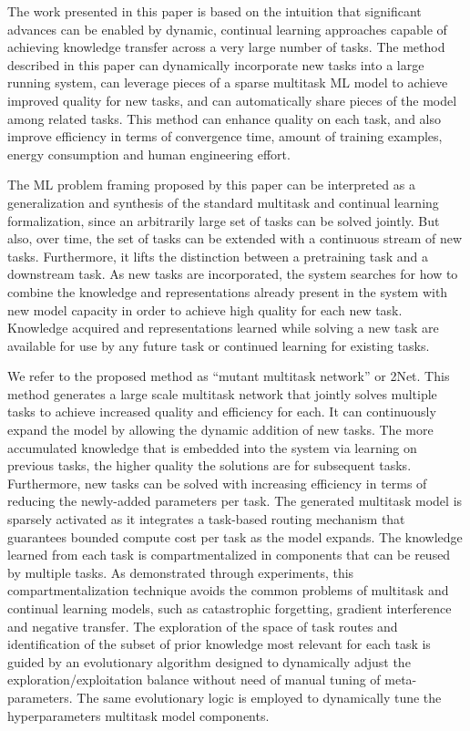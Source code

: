\documentclass{article} \usepackage{iclr2023_conference,times}
\newcommand{\muNet}{2Net\xspace}
\begin{document}
The work presented in this paper is based on the intuition that significant advances can be 
enabled by
dynamic, continual learning 
approaches capable of achieving knowledge transfer across a very large number of tasks.
The method described in this paper can dynamically incorporate new tasks into a large running system,
can leverage pieces of a sparse multitask ML model to achieve improved quality for new tasks,
and can automatically share pieces of the model among related tasks.
This method can enhance quality on each task, and also improve efficiency in terms of convergence time, amount of training examples, energy consumption and human engineering effort. 

The ML problem framing proposed by this paper can be interpreted as a generalization and synthesis of the standard multitask and continual learning formalization,
since an arbitrarily large set of tasks can be solved jointly.
But also, over time, the set of tasks can be extended with a continuous stream of new tasks.
Furthermore, it lifts the distinction between a pretraining task and a downstream task.
As new tasks are incorporated, the system searches for how to combine the knowledge and representations already present in the system with new model capacity in order to achieve high quality for each new task.
Knowledge acquired and representations learned while solving a new task are available for use by any future task or continued learning for existing tasks.

We refer to the proposed method as “mutant multitask network” or \muNet.
This method generates a large scale multitask network that jointly solves multiple tasks to achieve increased quality and efficiency for each.
It can continuously expand the model by allowing the dynamic addition of new tasks.
The more accumulated knowledge that is embedded into the system via learning on previous tasks, the higher quality the solutions are for subsequent tasks.  Furthermore, new tasks can be solved with increasing efficiency in terms of reducing the newly-added parameters per task.
The generated multitask model is sparsely activated as it integrates a task-based routing mechanism that guarantees bounded compute cost per task as the model expands.
The knowledge learned from each task is compartmentalized in components that can be reused by multiple tasks.
As demonstrated through experiments, this compartmentalization technique avoids the common problems of multitask and continual learning models, such as catastrophic forgetting, gradient interference and negative transfer.
The exploration of the space of task routes and identification of the subset of prior knowledge most relevant for each task is guided by an evolutionary algorithm designed to dynamically adjust the exploration/exploitation balance without need of manual tuning of meta-parameters.
The same evolutionary logic is employed to dynamically tune the hyperparameters multitask model components.
\end{document}
